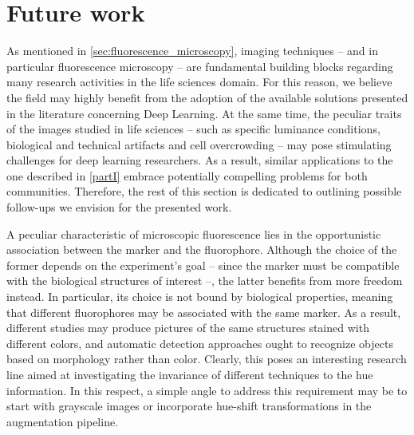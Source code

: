 \section{Future work}

As mentioned in \cref{sec:fluorescence_microscopy}, imaging techniques -- and in particular fluorescence microscopy -- are fundamental building blocks regarding many research activities in the life sciences domain.
For this reason, we believe the field may highly benefit from the adoption of the available solutions presented in the literature concerning Deep Learning.
At the same time, the peculiar traits of the images studied in life sciences -- such as specific luminance conditions, biological and technical artifacts and cell overcrowding -- may pose stimulating challenges for deep learning researchers.
As a result, similar applications to the one described in \cref{partI} embrace potentially compelling problems for both communities. Therefore, the rest of this section is dedicated to outlining possible follow-ups we envision for the presented work.

A peculiar characteristic of microscopic fluorescence lies in the opportunistic association between the marker and the fluorophore.
Although the choice of the former depends on the experiment's goal -- since the marker must be compatible with the biological structures of interest --, the latter benefits from more freedom instead.
In particular, its choice is not bound by biological properties, meaning that different fluorophores may be associated with the same marker.
As a result, different studies may produce pictures of the same structures stained with different colors, and automatic detection approaches ought to recognize objects based on morphology rather than color.
Clearly, this poses an interesting research line aimed at investigating the invariance of different techniques to the hue information.
In this respect, a simple angle to address this requirement may be to start with grayscale images or incorporate hue-shift transformations in the augmentation pipeline.


